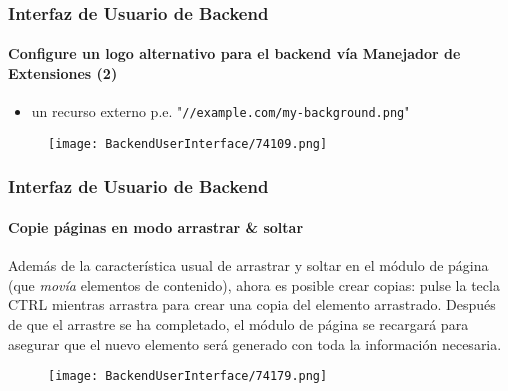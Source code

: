 \begin{frame}[fragile]
	\frametitle{Interfaz de Usuario de Backend}
	\framesubtitle{Configure un logo alternativo para el backend vía Manejador de Extensiones (2)}

	\begin{itemize}
		\item un recurso externo\newline
			\smaller
				p.e. "\texttt{//example.com/my-background.png}"
			\normalsize

	\end{itemize}

	\begin{figure}
		\texttt{[image: BackendUserInterface/74109.png]}
	\end{figure}

\end{frame}

\begin{frame}[fragile]
	\frametitle{Interfaz de Usuario de Backend}
	\framesubtitle{Copie páginas en modo arrastrar \& soltar}

	Además de la característica usual de arrastrar y soltar en el módulo de página (que \textit{movía} elementos de contenido),
	ahora es posible crear copias: pulse la tecla CTRL mientras arrastra para crear una copia del elemento
	arrastrado. Después de que el arrastre se ha completado, el módulo de página se recargará para asegurar que el nuevo elemento será
	generado con toda la información necesaria.

	\begin{figure}
		\texttt{[image: BackendUserInterface/74179.png]}
	\end{figure}

\end{frame}

